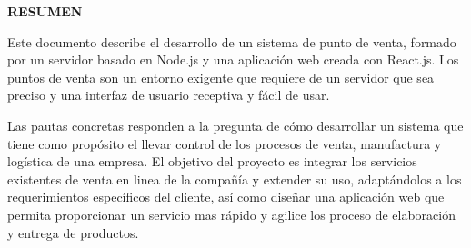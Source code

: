 
\begin{center}
  {\Large \bf{RESUMEN}}
\end{center}
Este documento describe el desarrollo de un sistema de punto de venta, formado por un servidor basado en Node.js y una aplicación web creada con React.js. Los puntos de venta son un entorno exigente que requiere de un servidor que sea preciso y una interfaz de usuario receptiva y fácil de usar. 
\vspace{0.8cm}

Las pautas concretas responden a la pregunta de cómo desarrollar un sistema que tiene como propósito el llevar control de los procesos de venta, manufactura y logística de una empresa. El objetivo del proyecto es integrar los servicios existentes de venta en linea de la compañía y extender su uso, adaptándolos a los requerimientos específicos del cliente, así como diseñar una aplicación web que permita proporcionar un servicio mas rápido y agilice los proceso de elaboración y entrega de productos.